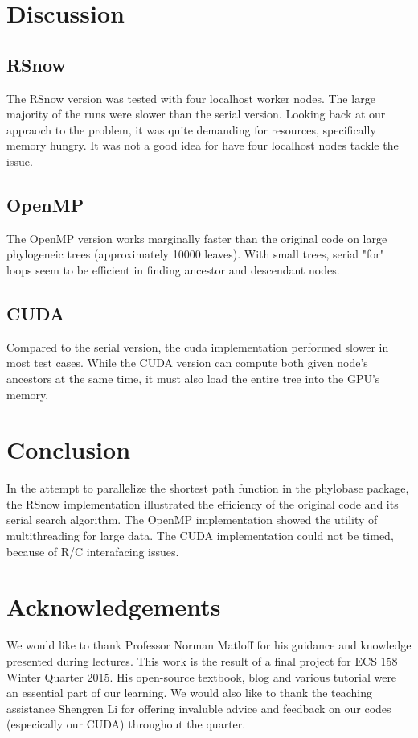\documentclass[11pt,letterpaper]{article}
\begin{document}
\section{Discussion}

\subsection{RSnow}
The RSnow version was tested with four localhost worker nodes. The large majority of the runs were slower than the serial version. Looking back at our appraoch to the problem, it was quite demanding for resources, specifically memory hungry. It was not a good idea for have four localhost nodes tackle the issue. \\

\subsection{OpenMP}
The OpenMP version works marginally faster than the original code on large phylogeneic trees (approximately 10000 leaves). With small trees, serial "for" loops seem to be efficient in finding ancestor and descendant nodes. \\

\subsection{CUDA}

Compared to the serial version, the cuda implementation performed slower in most test cases. While the CUDA version can compute both given node’s ancestors at the same time, it must also load the entire tree into the GPU’s memory.\\


\section{Conclusion}
In the attempt to parallelize the shortest path function in the phylobase package, the RSnow implementation illustrated the efficiency of the original code and its serial search algorithm. The OpenMP implementation showed the utility of multithreading for large data. The CUDA implementation could not be timed, because of R/C interafacing issues. 


\section{Acknowledgements}
We would like to thank Professor Norman Matloff for his guidance and knowledge presented during lectures. This work is the result of a final project for ECS 158 Winter Quarter 2015.  His open-source textbook, blog and various tutorial were an essential part of our learning. We would also like to thank the teaching assistance Shengren Li for offering invaluble advice and feedback on our codes (especically our CUDA) throughout the quarter.
\end{document}

